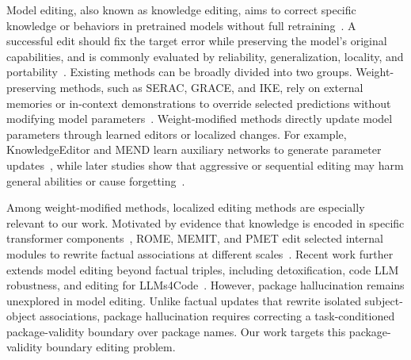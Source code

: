 
Model editing, also known as knowledge editing, aims to correct specific knowledge or behaviors in pretrained models without full retraining~\cite{sinitsin2020editable,zhu2020modifying,wang2024detoxifying}. 
A successful edit should fix the target error while preserving the model's original capabilities, and is commonly evaluated by reliability, generalization, locality, and portability~\cite{zhang2024comprehensive,wang2024easyedit}. 
Existing methods can be broadly divided into two groups. 
Weight-preserving methods, such as SERAC, GRACE, and IKE, rely on external memories or in-context demonstrations to override selected predictions without modifying model parameters~\cite{mitchell2022memory,hartvigsen2023aging,zheng2023edit}. 
Weight-modified methods directly update model parameters through learned editors or localized changes. 
For example, KnowledgeEditor and MEND learn auxiliary networks to generate parameter updates~\cite{de2021editing,mitchell2022mend}, while later studies show that aggressive or sequential editing may harm general abilities or cause forgetting~\cite{gu2024modeleditingharms,gupta2024catastrophic}.

Among weight-modified methods, localized editing methods are especially relevant to our work.
Motivated by evidence that knowledge is encoded in specific transformer components~\cite{geva2021transformer,dai2022knowledge}, ROME, MEMIT, and PMET edit selected internal modules to rewrite factual associations at different scales~\cite{meng2022rome,meng2023memit,li2024pmet}. 
Recent work further extends model editing beyond factual triples, including detoxification, code LLM robustness, and editing for LLMs4Code~\cite{wang2024detoxifying,liu2025creme,li2025model}. 
However, package hallucination remains unexplored in model editing. 
Unlike factual updates that rewrite isolated subject-object associations, package hallucination requires correcting a task-conditioned package-validity boundary over package names. 
Our work targets this package-validity boundary editing problem.
